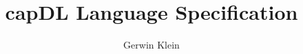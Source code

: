 \documentclass[english,a4paper,11pt]{article}
\begin{document}
\title{capDL Language Specification}
\author{Gerwin Klein}
\date{}

\maketitle


\end{document}
